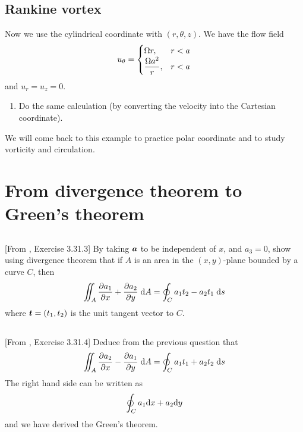 \documentclass[11pt,letterpaper]{article}
\begin{document}
\subsection{Rankine vortex}
Now we use the cylindrical coordinate with $(r,\theta,z)$. We have the flow field
\begin{align}
    u_\theta = \begin{cases}
        \Omega r, & r<a\\
        \displaystyle{\frac{\Omega a^2}{r}}, & r<a
    \end{cases}
\end{align}
and $u_r = u_z = 0$. 
\begin{enumerate}
    \item Do the same calculation (by converting the velocity into the Cartesian coordinate).
\end{enumerate}
We will come back to this example to practice polar coordinate and to study vorticity and circulation.  

\section{From divergence theorem to Green's theorem}
\subsection{}
[From \cite{Aris_62}, Exercise 3.31.3] By taking $\boldsymbol{a}$ to be independent of $x$, and $a_3 = 0$, show using divergence theorem that if $A$ is an area in the $(x,y)$-plane bounded by a curve $C$, then
\begin{align}
    \iint_A \frac{\partial a_1}{\partial x}+\frac{\partial a_2}{\partial y}\;\mathrm{d} A = \oint_C a_1t_2-a_2t_1\;\mathrm{d} s
\end{align}
where $\boldsymbol{t}=(t_1,t_2)$ is the unit tangent vector to $C$. 

\subsection{}
[From \cite{Aris_62}, Exercise 3.31.4] Deduce from the previous question that
\begin{align}
    \iint_A \frac{\partial a_2}{\partial x}-\frac{\partial a_1}{\partial y}\;\mathrm{d} A = \oint_C a_1t_1+a_2t_2\;\mathrm{d} s
\end{align}
The right hand side can be written as
\begin{align}
    \oint_C a_1\mathrm{d} x+a_2\mathrm{d} y
\end{align}
and we have derived the Green's theorem.
\end{document}

